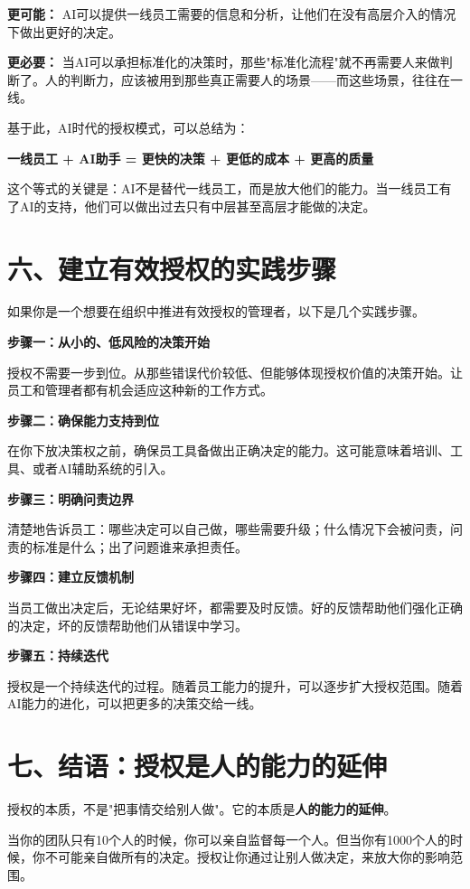 \textbf{更可能：} AI可以提供一线员工需要的信息和分析，让他们在没有高层介入的情况下做出更好的决定。

\textbf{更必要：} 当AI可以承担标准化的决策时，那些"标准化流程"就不再需要人来做判断了。人的判断力，应该被用到那些真正需要人的场景——而这些场景，往往在一线。

基于此，AI时代的授权模式，可以总结为：

\textbf{一线员工 + AI助手 = 更快的决策 + 更低的成本 + 更高的质量}

这个等式的关键是：AI不是替代一线员工，而是放大他们的能力。当一线员工有了AI的支持，他们可以做出过去只有中层甚至高层才能做的决定。

\section{六、建立有效授权的实践步骤}


如果你是一个想要在组织中推进有效授权的管理者，以下是几个实践步骤。

\textbf{步骤一：从小的、低风险的决策开始}

授权不需要一步到位。从那些错误代价较低、但能够体现授权价值的决策开始。让员工和管理者都有机会适应这种新的工作方式。

\textbf{步骤二：确保能力支持到位}

在你下放决策权之前，确保员工具备做出正确决定的能力。这可能意味着培训、工具、或者AI辅助系统的引入。

\textbf{步骤三：明确问责边界}

清楚地告诉员工：哪些决定可以自己做，哪些需要升级；什么情况下会被问责，问责的标准是什么；出了问题谁来承担责任。

\textbf{步骤四：建立反馈机制}

当员工做出决定后，无论结果好坏，都需要及时反馈。好的反馈帮助他们强化正确的决定，坏的反馈帮助他们从错误中学习。

\textbf{步骤五：持续迭代}

授权是一个持续迭代的过程。随着员工能力的提升，可以逐步扩大授权范围。随着AI能力的进化，可以把更多的决策交给一线。

\section{七、结语：授权是人的能力的延伸}


授权的本质，不是"把事情交给别人做"。它的本质是\textbf{人的能力的延伸}。

当你的团队只有10个人的时候，你可以亲自监督每一个人。但当你有1000个人的时候，你不可能亲自做所有的决定。授权让你通过让别人做决定，来放大你的影响范围。


